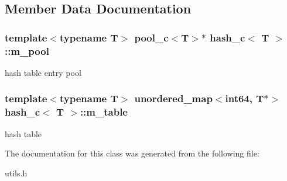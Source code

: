 \subsection{Member Data Documentation}
\hypertarget{classhash__c_a2eae988c3f90632b9addbfd17bfa11c7}{
\subsubsection[{m\_\-pool}]{\setlength{\rightskip}{0pt plus 5cm}template$<$typename T$>$ {\bf pool\_\-c}$<$T$>$$\ast$ {\bf hash\_\-c}$<$ T $>$::{\bf m\_\-pool}}}
\label{classhash__c_a2eae988c3f90632b9addbfd17bfa11c7}
hash table entry pool \hypertarget{classhash__c_a236ffec711b4d2fdee1976aed4a515d0}{
\subsubsection[{m\_\-table}]{\setlength{\rightskip}{0pt plus 5cm}template$<$typename T$>$ unordered\_\-map$<$int64, T$\ast$$>$ {\bf hash\_\-c}$<$ T $>$::{\bf m\_\-table}}}
\label{classhash__c_a236ffec711b4d2fdee1976aed4a515d0}
hash table 

The documentation for this class was generated from the following file:\begin{DoxyCompactItemize}
\item 
utils.h\end{DoxyCompactItemize}

